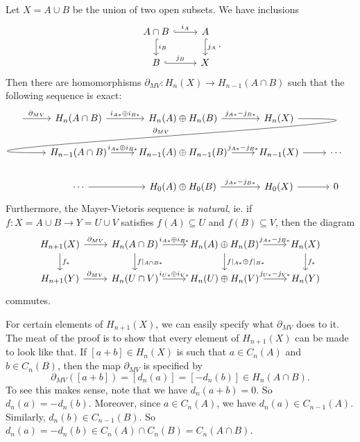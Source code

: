 \documentclass[a4paper]{article}
\theoremstyle{definition}
\begin{document}
\begin{thm}
  Let $X = A \cup B$ be the union of two open subsets. We have inclusions
  \[
    \begin{tikzcd}
      A \cap B \ar[r, "i_A", hook] \ar[d, "i_B", hook] & A \ar[d, hook, "j_A"]\\
      B \ar[r, hook, "j_B"] & X
    \end{tikzcd}.
  \]
  Then there are homomorphisms $\partial_{MV}: H_n(X) \to H_{n - 1}(A \cap B)$ such that the following sequence is exact:
  \[
    \begin{tikzcd}
      \ar[r, "\partial_{MV}"] & H_n(A \cap B) \ar[r, "i_{A*} \oplus i_{B*}"] & H_n(A) \oplus H_n(B) \ar[r, "j_{A*} - j_{B*}"] & H_n(X)\ar[out=0, in=180, looseness=2, overlay, lld, "\partial_{MV}"']\\
      & H_{n - 1}(A \cap B) \ar[r, "i_{A*} \oplus i_{B*}"] & H_{n - 1}(A) \oplus H_{n - 1}(B) \ar[r, "j_{A*} - j_{B*}"] & H_{n - 1}(X) \ar [r] & \cdots\\
      &\cdots \ar[r] & H_0(A) \oplus H_0(B) \ar[r, "j_{A*} - j_{B*}"] & H_0(X) \ar [r] & 0
    \end{tikzcd}
  \]
  Furthermore, the Mayer-Vietoris sequence is \emph{natural}, ie. if $f: X = A\cup B \to Y = U \cup V$ satisfies $f(A) \subseteq U$ and $f(B) \subseteq V$, then the diagram
  \[
    \begin{tikzcd}
       H_{n + 1}(X) \ar[r, "\partial_{MV}"] \ar[d, "f_*"] & H_{n}(A \cap B) \ar[r, "i_{A*} \oplus i_{B*}"] \ar[d, "f|_{A \cap B*}"] & H_n(A) \oplus H_n(B) \ar[r, "j_{A*} - j_{B*}"] \ar[d, "f|_{A*} \oplus f|_{B*}"] & H_n(X) \ar[d, "f_*"]\\
       H_{n + 1}(Y) \ar[r, "\partial_{MV}"] & H_{n}(U \cap V) \ar[r, "i_{U*} \oplus i_{V*}"] & H_n(U) \oplus H_n(V) \ar[r, "j_{U*} - j_{V*}"] & H_n(Y)
    \end{tikzcd}
  \]
  commutes.
\end{thm}
For certain elements of $H_{n + 1}(X)$, we can easily specify what $\partial_{MV}$ does to it. The meat of the proof is to show that every element of $H_{n + 1}(X)$ can be made to look like that. If $[a + b] \in H_n(X)$ is such that $a \in C_n(A)$ and $b \in C_n(B)$, then the map $\partial_{MV}$ is specified by
\[
  \partial_{MV}([a + b]) = [d_n(a)] = [-d_n(b)] \in H_n(A \cap B).
\]
To see this makes sense, note that we have $d_n(a + b) = 0$. So $d_n(a) = - d_n(b)$. Moreover, since $a \in C_n(A)$, we have $d_n(a) \in C_{n - 1}(A)$. Similarly, $d_n(b) \in C_{n - 1}(B)$. So $d_n(a) = - d_n(b) \in C_n(A) \cap C_n(B) = C_n(A \cap B)$.
\end{document}
